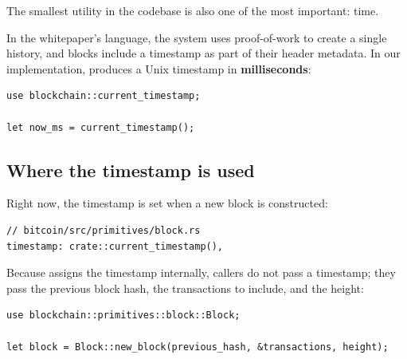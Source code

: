 The smallest utility in the codebase is also one of the most important: time.

In the whitepaper's language, the system uses proof-of-work to create a single history,
and blocks include a timestamp as part of their header metadata. In our implementation,
 produces a Unix timestamp in \textbf{milliseconds}:

\begin{listing}[htbp]
\caption{Using the timestamp utility}
\label{lst:7-1}
\begin{verbatim}
use blockchain::current_timestamp;

let now_ms = current_timestamp();
\end{verbatim}
\end{listing}

\subsection{Where the timestamp is used}
\label{sec:ch07-timestamp-where}

Right now, the timestamp is set when a new block is constructed:

\begin{listing}[htbp]
\caption{Timestamp in block construction}
\label{lst:7-2}
\begin{verbatim}
// bitcoin/src/primitives/block.rs
timestamp: crate::current_timestamp(),
\end{verbatim}
\end{listing}

Because  assigns the timestamp internally, callers do not
pass a timestamp; they pass the previous block hash, the transactions to include, and
the height:

\begin{listing}[htbp]
\caption{Creating a block without explicit timestamp}
\label{lst:7-3}
\begin{verbatim}
use blockchain::primitives::block::Block;

let block = Block::new_block(previous_hash, &transactions, height);
\end{verbatim}
\end{listing}


